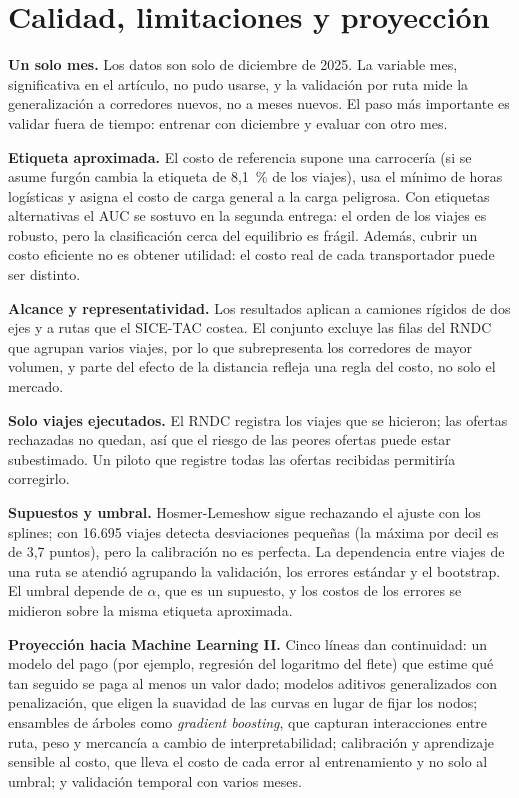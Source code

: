\documentclass[11pt,letterpaper]{article}
\begin{document}
\section{Calidad, limitaciones y proyección}

\textbf{Un solo mes.} Los datos son solo de diciembre de 2025. La variable mes, significativa en el artículo, no pudo usarse, y la validación por ruta mide la generalización a corredores nuevos, no a meses nuevos. El paso más importante es validar fuera de tiempo: entrenar con diciembre y evaluar con otro mes.

\textbf{Etiqueta aproximada.} El costo de referencia supone una carrocería (si se asume furgón cambia la etiqueta de 8,1~\% de los viajes), usa el mínimo de horas logísticas y asigna el costo de carga general a la carga peligrosa. Con etiquetas alternativas el AUC se sostuvo en la segunda entrega: el orden de los viajes es robusto, pero la clasificación cerca del equilibrio es frágil. Además, cubrir un costo eficiente no es obtener utilidad: el costo real de cada transportador puede ser distinto.

\textbf{Alcance y representatividad.} Los resultados aplican a camiones rígidos de dos ejes y a rutas que el SICE-TAC costea. El conjunto excluye las filas del RNDC que agrupan varios viajes, por lo que subrepresenta los corredores de mayor volumen, y parte del efecto de la distancia refleja una regla del costo, no solo el mercado.

\textbf{Solo viajes ejecutados.} El RNDC registra los viajes que se hicieron; las ofertas rechazadas no quedan, así que el riesgo de las peores ofertas puede estar subestimado. Un piloto que registre todas las ofertas recibidas permitiría corregirlo.

\textbf{Supuestos y umbral.} Hosmer-Lemeshow sigue rechazando el ajuste con los splines; con 16.695 viajes detecta desviaciones pequeñas (la máxima por decil es de 3,7 puntos), pero la calibración no es perfecta. La dependencia entre viajes de una ruta se atendió agrupando la validación, los errores estándar y el bootstrap. El umbral depende de $\alpha$, que es un supuesto, y los costos de los errores se midieron sobre la misma etiqueta aproximada.

\textbf{Proyección hacia Machine Learning II.} Cinco líneas dan continuidad: un modelo del pago (por ejemplo, regresión del logaritmo del flete) que estime qué tan seguido se paga al menos un valor dado; modelos aditivos generalizados con penalización, que eligen la suavidad de las curvas en lugar de fijar los nodos; ensambles de árboles como \emph{gradient boosting}, que capturan interacciones entre ruta, peso y mercancía a cambio de interpretabilidad; calibración y aprendizaje sensible al costo, que lleva el costo de cada error al entrenamiento y no solo al umbral; y validación temporal con varios meses.
\end{document}
